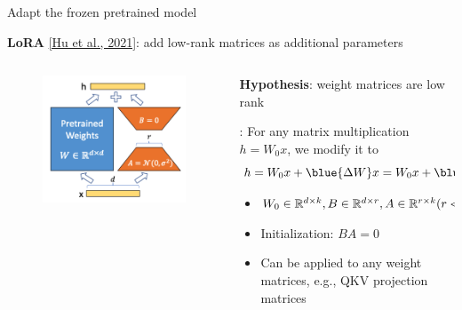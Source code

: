 \documentclass[usenames,dvipsnames,notes,11pt,aspectratio=169,hyperref={colorlinks=true, linkcolor=blue}]{beamer}
\begin{document}
\begin{frame}
    {Adapt the frozen pretrained model}

    \textbf{LoRA} \href{https://arxiv.org/pdf/2106.09685.pdf}{[Hu et al., 2021]}: add low-rank matrices as additional parameters  \\\bigskip

    \begin{columns}
        \begin{column}{0.3\textwidth}
    \begin{figure}
        \includegraphics[width=\textwidth]{figures/lora}
    \end{figure}
    \end{column}
        \begin{column}{0.7\textwidth}

            \textbf{Hypothesis}: weight matrices are low rank
            \medskip

            : For any matrix multiplication $h=W_0x$, we modify it to
            $$
            h = W_0x + \blue{\Delta W}x = W_0x + \blue{BA}x
            $$

            \begin{itemize}
                \item $W_0\in\mathbb{R}^{d\times k}, B\in \mathbb{R}^{d\times r}, A\in \mathbb{R}^{r\times k} (r \ll k)$
                \item Initialization: $BA=0$
                \item Can be applied to any weight matrices, e.g., QKV projection matrices
            \end{itemize}
        \end{column}
    \end{columns}
\end{frame}
\end{document}
